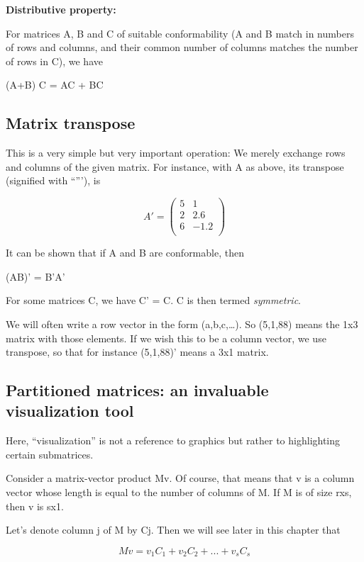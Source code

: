\documentclass[
  letterpaper,
  DIV=11,
  numbers=noendperiod,
  oneside]{scrreprt}
\begin{document}
\textbf{Distributive property:}

For matrices A, B and C of suitable conformability (A and B match in
numbers of rows and columns, and their common number of columns matches
the number of rows in C), we have

(A+B) C = AC + BC

\hypertarget{matrix-transpose}{%
\subsection{Matrix transpose}\label{matrix-transpose}}

This is a very simple but very important operation: We merely exchange
rows and columns of the given matrix. For instance, with A as above, its
transpose (signified with ``'''), is

\[
A' = \left (
\begin{array}{rr}
5 & 1 \\
2 & 2.6 \\
6 & -1.2 \\
\end{array}
\right )
\]

It can be shown that if A and B are conformable, then

(AB)' = B'A'

For some matrices C, we have C' = C. C is then termed \emph{symmetric}.

We will often write a row vector in the form (a,b,c,\ldots). So (5,1,88)
means the 1x3 matrix with those elements. If we wish this to be a column
vector, we use transpose, so that for instance (5,1,88)' means a 3x1
matrix.

\hypertarget{partitioned-matrices-an-invaluable-visualization-tool}{%
\subsection{Partitioned matrices: an invaluable visualization
tool}\label{partitioned-matrices-an-invaluable-visualization-tool}}

Here, ``visualization'' is not a reference to graphics but rather to
highlighting certain submatrices.

Consider a matrix-vector product Mv. Of course, that means that v is a
column vector whose length is equal to the number of columns of M. If M
is of size rxs, then v is sx1.

Let's denote column j of M by Cj. Then we will see later in this chapter
that

\[
Mv = 
v_1 C_{1} +
v_2 C_{2} + ... +
v_s C_{s}  
\]
\end{document}
